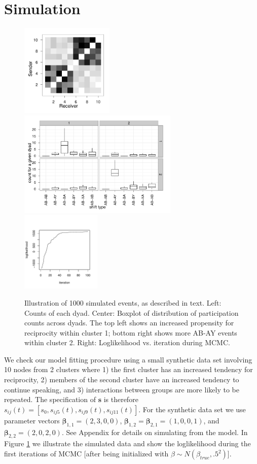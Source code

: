 \documentclass{article}
\begin{document}
\section{Simulation}
\begin{figure}
\center
\includegraphics[width=1.75in]{../figs/syn-mat.pdf}
\includegraphics[width=3in]{../figs/syn-counts.pdf}
\includegraphics[width=1.5in]{../figs/syn-llk.pdf}
\caption{Illustration of 1000 simulated events, as described in text. Left: Counts of each dyad. Center: Boxplot of distribution of participation counts across dyads.  The top left shows an increased propensity for reciprocity within cluster 1; bottom right shows more AB-AY events within cluster 2. Right: Loglikelihood vs. iteration during MCMC.}
\label{fig:syncounts}
\end{figure}

We check our model fitting procedure using a small synthetic data set involving 10 nodes from 2 clusters where 1) the first cluster has an increased tendency for reciprocity, 2) members of the second cluster have an increased tendency to continue speaking, and 3) interactions between groups are more likely to be repeated.  The specification of $\textbf{s}$ is therefore $s_{ij}(t) = [s_0, s_{ij5}(t), s_{ij9}(t), s_{ij11}(t)]$.  For the synthetic data set we use parameter vectors $\boldsymbol{\beta}_{1,1} = (2,3,0,0)$,  $\boldsymbol{\beta}_{1,2} = \boldsymbol{\beta}_{2,1} = (1,0,0,1)$, and $\boldsymbol{\beta}_{2,2} = (2,0,2,0)$.  See Appendix for details on simulating from the model.  In Figure \ref{fig:syncounts} we illustrate the simulated data and show the loglikelihood during the first iterations of MCMC [after being initialized with $\beta \sim N(\beta_{true},.5^2)$].
\end{document}
